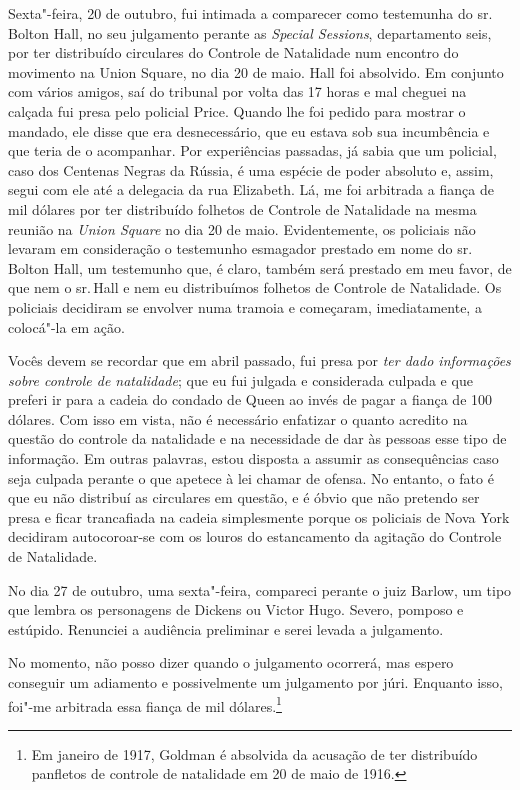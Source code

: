 Sexta"-feira, 20 de outubro, fui intimada a comparecer como testemunha do
sr.\,Bolton Hall, no seu julgamento perante as \textit{Special Sessions},
departamento seis, por ter distribuído circulares do Controle de
Natalidade num encontro do movimento na Union Square, no dia 20
de maio. Hall foi absolvido. Em conjunto com vários amigos, saí do
tribunal por volta das 17 horas e mal cheguei na calçada fui presa pelo
policial Price. Quando lhe foi pedido para mostrar o mandado, ele disse
que era desnecessário, que eu estava sob sua incumbência e que teria de
o acompanhar. Por experiências passadas, já sabia que um policial, caso
dos Centenas Negras da Rússia, é uma espécie de poder absoluto e, assim,
segui com ele até a delegacia da rua Elizabeth. Lá, me foi arbitrada a
fiança de mil dólares por ter distribuído folhetos de Controle de
Natalidade na mesma reunião na \emph{Union Square} no dia 20 de maio.
Evidentemente, os policiais não levaram em consideração o testemunho
esmagador prestado em nome do sr.\,Bolton Hall, um testemunho que, é
claro, também será prestado em meu favor, de que nem o sr.\,Hall e nem eu
distribuímos folhetos de Controle de Natalidade. Os policiais decidiram
se envolver numa tramoia e começaram, imediatamente, a colocá"-la em
ação.

Vocês devem se recordar que em abril passado, fui presa por \textit{ter
dado informações sobre controle de natalidade}; que eu fui julgada e
considerada culpada e que preferi ir para a cadeia do condado de Queen
ao invés de pagar a fiança de 100 dólares. Com isso em vista, não é
necessário enfatizar o quanto acredito na questão do controle da
natalidade e na necessidade de dar às pessoas esse tipo de informação.
Em outras palavras, estou disposta a assumir as consequências caso seja
culpada perante o que apetece à lei chamar de ofensa. No entanto, o fato
é que eu não distribuí as circulares em questão, e é óbvio que não
pretendo ser presa e ficar trancafiada na cadeia simplesmente porque os
policiais de Nova York decidiram autocoroar-se com os louros do estancamento
da agitação do Controle de Natalidade.


No dia 27 de outubro, uma sexta"-feira, compareci perante o juiz Barlow,
um tipo que lembra os personagens de Dickens ou Victor Hugo. Severo,
pomposo e estúpido. Renunciei a audiência preliminar e serei levada a
julgamento.

No momento, não posso dizer quando o julgamento ocorrerá, mas espero
conseguir um adiamento e possivelmente um julgamento por júri. Enquanto
isso, foi"-me arbitrada essa fiança de mil dólares.\footnote{Em janeiro de
  1917, Goldman é absolvida da acusação de ter distribuído panfletos de
  controle de natalidade em 20 de maio de 1916.}

